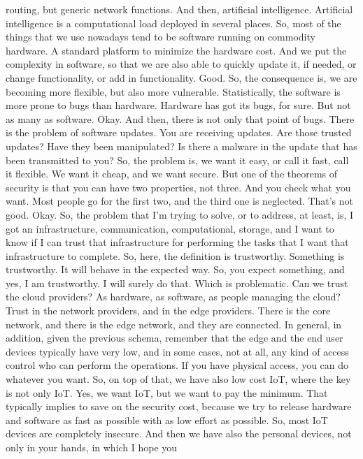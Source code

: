  routing, but generic network functions. And then, artificial intelligence.
 Artificial intelligence is a computational load deployed in several places.
 So, most of the things that we use nowadays tend to be software running on
 commodity hardware. A standard platform to minimize the hardware cost. And we
 put the complexity in software, so that we are also able to quickly update it,
 if needed, or change functionality, or add in functionality. Good. So, the
 consequence is, we are becoming more flexible, but also more vulnerable.
 Statistically, the software is more prone to bugs than hardware. Hardware has
 got its bugs, for sure. But not as many as software. Okay. And then, there is
 not only that point of bugs. There is the problem of software updates. You are
 receiving updates. Are those trusted updates? Have they been manipulated? Is
 there a malware in the update that has been transmitted to you? So, the
 problem is, we want it easy, or call it fast, call it flexible. We want it
 cheap, and we want secure. But one of the theorems of security is that you can
 have two properties, not three. And you check what you want. Most people go
 for the first two, and the third one is neglected. That's not good. Okay. So,
 the problem that I'm trying to solve, or to address, at least, is, I got an
 infrastructure, communication, computational, storage, and I want to know if I
 can trust that infrastructure for performing the tasks that I want that
 infrastructure to complete. So, here, the definition is trustworthy. Something
 is trustworthy. It will behave in the expected way. So, you expect something,
 and yes, I am trustworthy. I will surely do that. Which is problematic. Can we
 trust the cloud providers? As hardware, as software, as people managing the
 cloud? Trust in the network providers, and in the edge providers. There is the
 core network, and there is the edge network, and they are connected. In
 general, in addition, given the previous schema, remember that the edge and
 the end user devices typically have very low, and in some cases, not at all,
 any kind of access control who can perform the operations. If you have
 physical access, you can do whatever you want. So, on top of that, we have
 also low cost IoT, where the key is not only IoT. Yes, we want IoT, but we
 want to pay the minimum. That typically implies to save on the security cost,
 because we try to release hardware and software as fast as possible with as
 low effort as possible. So, most IoT devices are completely insecure. And then
 we have also the personal devices, not only in your hands, in which I hope you
